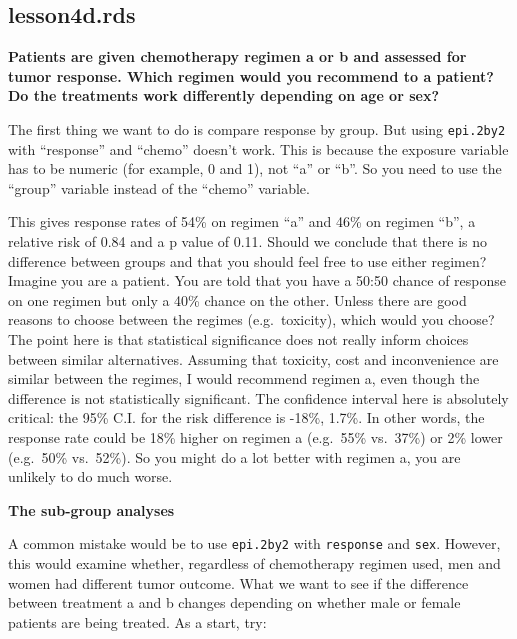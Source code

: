 \documentclass[]{book}
\newenvironment{Shaded}{\begin{snugshade}}{\end{snugshade}}
\newcommand{\CommentTok}[1]{\textcolor[rgb]{0.56,0.35,0.01}{\textit{#1}}}
\newcommand{\DecValTok}[1]{\textcolor[rgb]{0.00,0.00,0.81}{#1}}
\newcommand{\KeywordTok}[1]{\textcolor[rgb]{0.13,0.29,0.53}{\textbf{#1}}}
\newcommand{\NormalTok}[1]{#1}
\newcommand{\OperatorTok}[1]{\textcolor[rgb]{0.81,0.36,0.00}{\textbf{#1}}}
\newcommand{\StringTok}[1]{\textcolor[rgb]{0.31,0.60,0.02}{#1}}
\begin{document}
\hypertarget{lesson4d.rds}{%
\subsection{lesson4d.rds}\label{lesson4d.rds}}

\textbf{Patients are given chemotherapy regimen a or b and assessed for
tumor response. Which regimen would you recommend to a patient? Do the
treatments work differently depending on age or sex?}

The first thing we want to do is compare response by group. But using
\texttt{epi.2by2} with ``response'' and ``chemo'' doesn't work. This is
because the exposure variable has to be numeric (for example, 0 and 1),
not ``a'' or ``b''. So you need to use the ``group'' variable instead of
the ``chemo'' variable.

This gives response rates of 54\% on regimen ``a'' and 46\% on regimen
``b'', a relative risk of 0.84 and a p value of 0.11. Should we conclude
that there is no difference between groups and that you should feel free
to use either regimen? Imagine you are a patient. You are told that you
have a 50:50 chance of response on one regimen but only a 40\% chance on
the other. Unless there are good reasons to choose between the regimes
(e.g.~toxicity), which would you choose? The point here is that
statistical significance does not really inform choices between similar
alternatives. Assuming that toxicity, cost and inconvenience are similar
between the regimes, I would recommend regimen a, even though the
difference is not statistically significant. The confidence interval
here is absolutely critical: the 95\% C.I. for the risk difference is
-18\%, 1.7\%. In other words, the response rate could be 18\% higher on
regimen a (e.g.~55\% vs.~37\%) or 2\% lower (e.g.~50\% vs.~52\%). So you
might do a lot better with regimen a, you are unlikely to do much worse.

\textbf{The sub-group analyses}

A common mistake would be to use \texttt{epi.2by2} with
\texttt{response} and \texttt{sex}. However, this would examine whether,
regardless of chemotherapy regimen used, men and women had different
tumor outcome. What we want to see if the difference between treatment a
and b changes depending on whether male or female patients are being
treated. As a start, try:

\begin{Shaded}
\end{Shaded}
\end{document}
